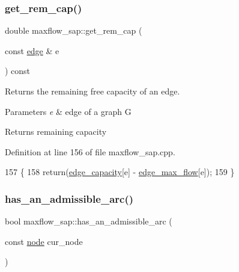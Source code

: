 \subsubsection{\texorpdfstring{get\+\_\+rem\+\_\+cap()}{get\_rem\_cap()}}
{\footnotesize\ttfamily double maxflow\+\_\+sap\+::get\+\_\+rem\+\_\+cap (\begin{DoxyParamCaption}\item[{const \mbox{\hyperlink{classedge}{edge}} \&}]{e }\end{DoxyParamCaption}) const}

Returns the remaining free capacity of an edge.


\begin{DoxyParams}{Parameters}
{\em e} & edge of a graph {\ttfamily G} \\
\hline
\end{DoxyParams}
\begin{DoxyReturn}{Returns}
remaining capacity 
\end{DoxyReturn}


Definition at line 156 of file maxflow\+\_\+sap.\+cpp.


\begin{DoxyCode}
157 \{
158     \textcolor{keywordflow}{return}(\mbox{\hyperlink{classmaxflow__sap_acfa95eef5ea5bf7814c4dabd3994bc63}{edge\_capacity}}[e] - \mbox{\hyperlink{classmaxflow__sap_a25820db833a98efc69fc3edb79fc49d3}{edge\_max\_flow}}[e]);
159 \}
\end{DoxyCode}
\mbox{\label{classmaxflow__sap_a4fdfe2e37832ed2e522b5c972aa1ba5f}} 
\subsubsection{\texorpdfstring{has\+\_\+an\+\_\+admissible\+\_\+arc()}{has\_an\_admissible\_arc()}}
{\footnotesize\ttfamily bool maxflow\+\_\+sap\+::has\+\_\+an\+\_\+admissible\+\_\+arc (\begin{DoxyParamCaption}\item[{const \mbox{\hyperlink{classnode}{node}}}]{cur\+\_\+node }\end{DoxyParamCaption})\hspace{0.3cm}{\ttfamily [protected]}}



